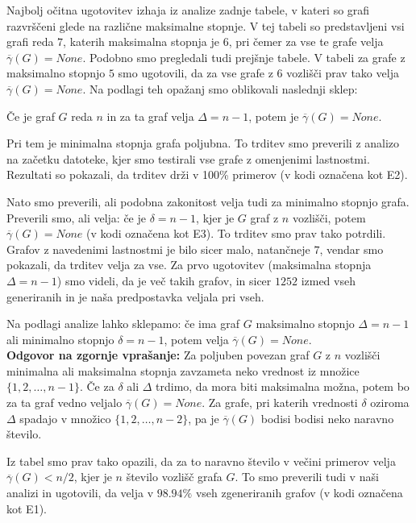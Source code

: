\documentclass[a4paper, 12pt]{article}
\begin{document}
 Najbolj očitna ugotovitev izhaja iz analize zadnje tabele, v kateri so grafi razvrščeni glede na različne maksimalne stopnje. V tej tabeli so predstavljeni vsi grafi reda $7$, katerih maksimalna stopnja je $6$, pri čemer za vse te grafe velja $\overline{\gamma}(G) = None$. Podobno smo pregledali tudi prejšnje tabele. V tabeli za grafe z maksimalno stopnjo $5$ smo ugotovili, da za vse grafe z $6$ vozlišči prav tako velja $\overline{\gamma}(G) = None$. Na podlagi teh opažanj smo oblikovali naslednji sklep: 

\begin{center}
Če je graf $G$ reda $n$ in za ta graf velja $\Delta = n - 1$, potem je $\overline{\gamma}(G) = None$.
\end{center}
Pri tem je minimalna stopnja grafa poljubna. To trditev smo preverili z analizo na začetku datoteke, kjer smo testirali vse grafe z omenjenimi lastnostmi. Rezultati so pokazali, da trditev drži v 100\% primerov (v kodi označena kot E2).

\noindent Nato smo preverili, ali podobna zakonitost velja tudi za minimalno stopnjo grafa. Preverili smo, ali velja: če je $\delta = n - 1$, kjer je $G$ graf z $n$ vozlišči, potem $\overline{\gamma}(G) = None$ (v kodi označena kot E3). To trditev smo prav tako potrdili. Grafov z navedenimi lastnostmi je bilo sicer malo, natančneje $7$, vendar smo pokazali, da trditev velja za vse. Za prvo ugotovitev (maksimalna stopnja $\Delta = n-1$) smo videli, da je več takih grafov, in sicer $1252$ izmed vseh generiranih in je naša predpostavka veljala pri vseh.

\noindent Na podlagi analize lahko sklepamo: če ima graf $G$ maksimalno stopnjo $\Delta = n - 1$ ali minimalno stopnjo $\delta = n - 1$, potem velja $\overline{\gamma}(G) = None$. \\

 
\noindent \textbf{Odgovor na zgornje vprašanje:} Za poljuben povezan graf \( G \) z \( n \) vozlišči minimalna ali maksimalna stopnja zavzameta neko vrednost iz množice \( \{1, 2, \dots, n-1\} \). Če za \( \delta \) ali \( \Delta \) trdimo, da mora biti maksimalna možna, potem bo za ta graf vedno veljalo \( \overline{\gamma}(G) = None \). Za grafe, pri katerih vrednosti \( \delta \) oziroma \( \Delta \) spadajo v množico \( \{1, 2, \dots, n-2\} \), pa je \( \overline{\gamma}(G) \) bodisi  bodisi neko naravno število. 

\noindent Iz tabel smo prav tako opazili, da za to naravno število v večini primerov velja \( \overline{\gamma}(G) < n/2 \), kjer je \( n \) število vozlišč grafa \( G \). To smo preverili tudi v naši analizi in ugotovili, da velja v \( 98.94\% \) vseh zgeneriranih grafov (v kodi označena kot E1).
\end{document}
